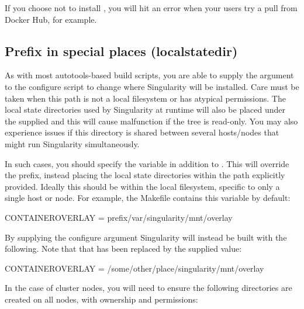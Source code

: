 \documentclass[letterpaper,10pt,english]{sphinxmanual}
\begin{document}
If you choose not to install , you will hit an error when your users try
a pull from Docker Hub, for example.


\subsection{Prefix in special places (\textendash{}localstatedir)}
\label{\detokenize{admin_quickstart:prefix-in-special-places-localstatedir}}
As with most autotools-based build scripts, you are able to supply the 
argument to the configure script to change where Singularity will be
installed. Care must be taken when this path is not a local filesystem
or has atypical permissions. The local state directories used by
Singularity at runtime will also be placed under the supplied  and this
will cause malfunction if the tree is read-only. You may also
experience issues if this directory is shared between several
hosts/nodes that might run Singularity simultaneously.

In such cases, you should specify the  variable in addition to . This
will override the prefix, instead placing the local state directories
within the path explicitly provided. Ideally this should be within the
local filesystem, specific to only a single host or node.
For example, the Makefile contains this variable by default:

%
\begin{sphinxVerbatim}[commandchars=\\\{\}]
CONTAINER\PYGZus{}OVERLAY = \PYGZdl{}\PYGZob{}prefix\PYGZcb{}/var/singularity/mnt/overlay
\end{sphinxVerbatim}

By supplying the configure argument  Singularity will instead be built
with the following. Note that  that has been replaced by the supplied
value:

%
\begin{sphinxVerbatim}[commandchars=\\\{\}]
CONTAINER\PYGZus{}OVERLAY = /some/other/place/singularity/mnt/overlay
\end{sphinxVerbatim}

In the case of cluster nodes, you will need to ensure the following
directories are created on all nodes, with  ownership and  permissions:
\end{document}
